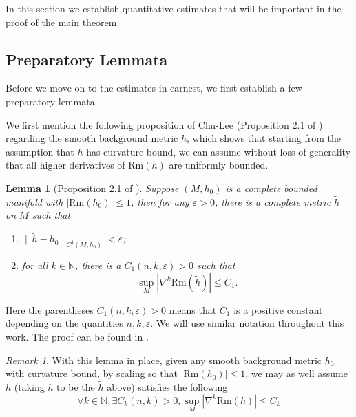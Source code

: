 \documentclass[12pt]{amsart}
\theoremstyle{plain}
\theoremstyle{plain}
\newtheorem{lemma}[subsection]{Lemma}
\theoremstyle{definition}
\theoremstyle{remark}
\newtheorem{remark}[subsection]{Remark}
\numberwithin{equation}{subsection}
\newcommand{\del}{\nabla}
\begin{document}
In this section we establish quantitative estimates that will be important in the proof of the main theorem.

\subsection{Preparatory Lemmata}

Before we move on to the estimates in earnest, we first establish a few preparatory lemmata.

We first mention the following proposition of Chu-Lee (Proposition 2.1 of \cite{chu_ricci-deturck_2022}) regarding the smooth background metric $h$, which shows that starting from the assumption that $h$ has curvature bound, we can assume without loss of generality that all higher derivatives of $\text{Rm}(h)$ are uniformly bounded.

\begin{lemma}[Proposition 2.1 of \cite{chu_ricci-deturck_2022}]\label{lem:estimates-h-star}
    Suppose $(M, h_0)$ is a complete bounded manifold with $|\text{Rm}(h_0)|\leq 1$, then for any $\varepsilon > 0$, there is a complete metric $\tilde{h}$ on $M$ such that
    \begin{enumerate}
        \item $\lVert \tilde{h} - h_0\rVert_{C^1(M,h_0)} < \varepsilon$;
        \item for all $k \in \mathbb{N}$, there is a $C_1(n,k,\varepsilon) > 0$ such that
        \begin{equation*}
            \sup\limits_M |\del^k \text{Rm}(\tilde{h})| \leq C_1.
        \end{equation*}
    \end{enumerate}
\end{lemma}

Here the parentheses $C_1(n,k,\varepsilon) > 0$ means that $C_1$ is a positive constant depending on the quantities $n, k, \varepsilon$. We will use similar notation throughout this work. The proof can be found in \cite{chu_ricci-deturck_2022}.

\begin{remark}\label{rmk:estimates-h-remark}
With this lemma in place, given any smooth background metric $h_0$ with curvature bound, by scaling so that $|\text{Rm}(h_0)|\leq 1$, we may as well assume $h$ (taking $h$ to be the $\tilde{h}$ above) satisfies the following
\begin{equation}\label{eqn:h-remark-curvature-estimates}
    \forall k \in \mathbb{N}, \exists C_k(n,k) > 0, \sup\limits_{M}|\del^k\text{Rm}(h)| \leq C_k
\end{equation}
\end{remark}
\end{document}
